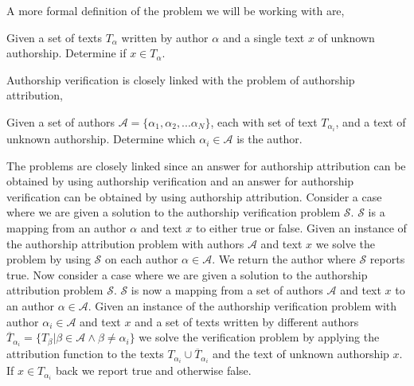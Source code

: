 
A more formal definition of the problem we will be working with are,

\begin{definition}

    Given a set of texts $T_\alpha$ written by author $\alpha$ and a single
    text $x$ of unknown authorship. Determine if $x \in T_\alpha$.

\end{definition}

Authorship verification is closely linked with the problem of authorship
attribution,

\begin{definition}

    Given a set of authors $\mathcal{A} = \{ \alpha_1, \alpha_2,...\alpha_N\}$,
    each with set of text $T_{\alpha_i}$, and a text of unknown authorship.
    Determine which $\alpha_i \in \mathcal{A}$ is the author.

\end{definition}

The problems are closely linked since an answer for authorship attribution
can be obtained by using authorship verification and an answer for authorship
verification can be obtained by using authorship attribution. Consider a
case where we are given a solution to the authorship verification problem
$\mathcal{S}$. $\mathcal{S}$ is a mapping from an author $\alpha$ and text
$x$ to either true or false. Given an instance of the authorship attribution
problem with authors $\mathcal{A}$ and text $x$ we solve the problem by using
$\mathcal{S}$ on each author $\alpha \in \mathcal{A}$. We return the author
where $\mathcal{S}$ reports true. Now consider a case where we are given a
solution to the authorship attribution problem $\mathcal{S}$. $\mathcal{S}$ is
now a mapping from a set of authors $\mathcal{A}$ and text $x$ to an author
$\alpha \in \mathcal{A}$. Given an instance of the authorship verification
problem with author $\alpha_i \in \mathcal{A}$ and text $x$ and a set of
texts written by different authors $\overline{T}_{\alpha_i} = \{T_\beta | \beta
\in \mathcal{A} \land \beta \neq \alpha_i\}$ we solve the verification
problem by applying the attribution function to the texts $T_{\alpha_i}
\cup \overline{T}_{\alpha_i}$ and the text of unknown authorship $x$. If $x \in
T_{\alpha_i}$ back we report true and otherwise false.
